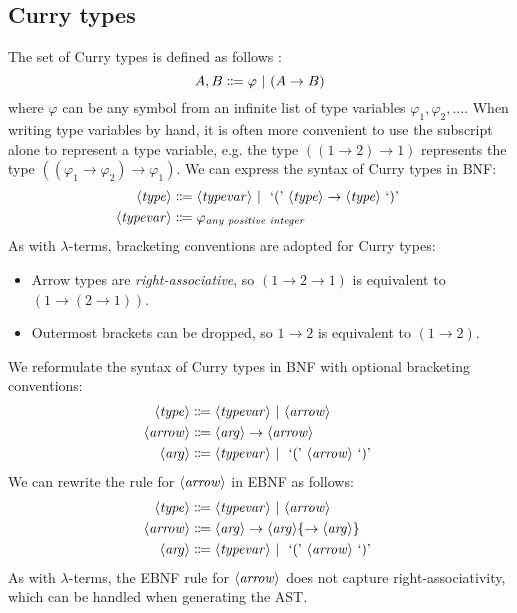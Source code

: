 \subsection{Curry types}\label{lambda:curry-types}
The set of Curry types is defined as follows \cite{van-bakel:2022}:
\[
    A, B \Coloneqq \varphi \ |\  (A \rightarrow B)
\]
where $\varphi$ can be any symbol from an infinite list of type variables $\varphi_1, \varphi_2, \ldots$. When writing type variables by hand, it is often more convenient to use the subscript alone to represent a type variable, e.g. the type $((1 \rightarrow 2) \rightarrow 1)$ represents the type $((\varphi_1 \rightarrow \varphi_2) \rightarrow \varphi_1)$. We can express the syntax of Curry types in BNF:
\begin{align*}
    \langle\mathit{type}\rangle &\Coloneqq \langle\mathit{typevar}\rangle \ |\  \text{ `(' } \langle\mathit{type}\rangle \rightarrow \langle\mathit{type}\rangle \text{ `)' } \\
    \langle\mathit{typevar}\rangle &\Coloneqq \varphi_{\textit{any positive integer}}
\end{align*}
As with $\lambda$-terms, bracketing conventions are adopted for Curry types:
\begin{itemize}
    \item Arrow types are \textit{right-associative}, so $(1 \rightarrow 2 \rightarrow 1)$ is equivalent to $(1 \rightarrow (2 \rightarrow 1))$.
    \item Outermost brackets can be dropped, so $1 \rightarrow 2$ is equivalent to $(1 \rightarrow 2)$.
\end{itemize}
We reformulate the syntax of Curry types in BNF with optional bracketing conventions:
\begin{align*}
    \langle\mathit{type}\rangle &\Coloneqq \langle\mathit{typevar}\rangle \ |\  \langle\mathit{arrow}\rangle \\
    \langle\mathit{arrow}\rangle &\Coloneqq \langle\mathit{arg}\rangle \rightarrow \langle\mathit{arrow}\rangle \\
    \langle\mathit{arg}\rangle &\Coloneqq \langle\mathit{typevar}\rangle \ |\  \text{ `(' } \langle\mathit{arrow}\rangle \text{ `)' }
\end{align*}
We can rewrite the rule for $\langle\mathit{arrow}\rangle$ in EBNF as follows:
\begin{align*}
    \langle\mathit{type}\rangle &\Coloneqq \langle\mathit{typevar}\rangle \ |\  \langle\mathit{arrow}\rangle \\
    \langle\mathit{arrow}\rangle &\Coloneqq \langle\mathit{arg}\rangle \rightarrow \langle\mathit{arg}\rangle \{\rightarrow \langle\mathit{arg}\rangle\} \\
    \langle\mathit{arg}\rangle &\Coloneqq \langle\mathit{typevar}\rangle \ |\  \text{ `(' } \langle\mathit{arrow}\rangle \text{ `)' }
\end{align*}
As with $\lambda$-terms, the EBNF rule for $\langle\mathit{arrow}\rangle$ does not capture right-associativity, which can be handled when generating the AST.

